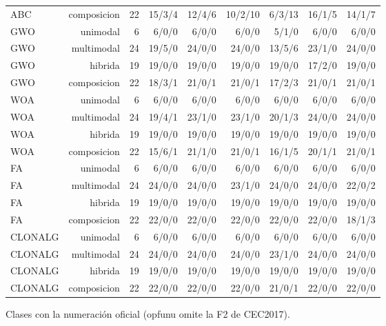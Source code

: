 \begin{table}[ht]
\begin{tabular}{lrrrrrrrr}
ABC & composicion & 22 & 15/3/4 & 12/4/6 & 10/2/10 & 6/3/13 & 16/1/5 & 14/1/7 \\
GWO & unimodal & 6 & 6/0/0 & 6/0/0 & 6/0/0 & 5/1/0 & 6/0/0 & 6/0/0 \\
GWO & multimodal & 24 & 19/5/0 & 24/0/0 & 24/0/0 & 13/5/6 & 23/1/0 & 24/0/0 \\
GWO & hibrida & 19 & 19/0/0 & 19/0/0 & 19/0/0 & 19/0/0 & 17/2/0 & 19/0/0 \\
GWO & composicion & 22 & 18/3/1 & 21/0/1 & 21/0/1 & 17/2/3 & 21/0/1 & 21/0/1 \\
WOA & unimodal & 6 & 6/0/0 & 6/0/0 & 6/0/0 & 6/0/0 & 6/0/0 & 6/0/0 \\
WOA & multimodal & 24 & 19/4/1 & 23/1/0 & 23/1/0 & 20/1/3 & 24/0/0 & 24/0/0 \\
WOA & hibrida & 19 & 19/0/0 & 19/0/0 & 19/0/0 & 19/0/0 & 19/0/0 & 19/0/0 \\
WOA & composicion & 22 & 15/6/1 & 21/1/0 & 21/0/1 & 16/1/5 & 20/1/1 & 21/0/1 \\
FA & unimodal & 6 & 6/0/0 & 6/0/0 & 6/0/0 & 6/0/0 & 6/0/0 & 6/0/0 \\
FA & multimodal & 24 & 24/0/0 & 24/0/0 & 23/1/0 & 24/0/0 & 24/0/0 & 22/0/2 \\
FA & hibrida & 19 & 19/0/0 & 19/0/0 & 19/0/0 & 19/0/0 & 19/0/0 & 19/0/0 \\
FA & composicion & 22 & 22/0/0 & 22/0/0 & 22/0/0 & 22/0/0 & 22/0/0 & 18/1/3 \\
CLONALG & unimodal & 6 & 6/0/0 & 6/0/0 & 6/0/0 & 6/0/0 & 6/0/0 & 6/0/0 \\
CLONALG & multimodal & 24 & 24/0/0 & 24/0/0 & 24/0/0 & 23/1/0 & 24/0/0 & 24/0/0 \\
CLONALG & hibrida & 19 & 19/0/0 & 19/0/0 & 19/0/0 & 19/0/0 & 19/0/0 & 19/0/0 \\
CLONALG & composicion & 22 & 22/0/0 & 22/0/0 & 22/0/0 & 21/0/1 & 22/0/0 & 22/0/0 \\
\bottomrule
\end{tabular}
\par\footnotesize Clases con la numeración oficial (opfunu omite la F2 de CEC2017).
\end{table}

